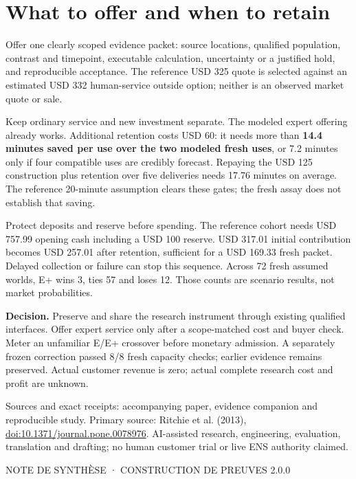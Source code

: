 \documentclass[10pt]{article}
\begin{document}
\section*{What to offer and when to retain}

Offer one clearly scoped evidence packet: source locations, qualified population, contrast and timepoint, executable calculation, uncertainty or a justified hold, and reproducible acceptance. The reference USD 325 quote is selected against an estimated USD 332 human-service outside option; neither is an observed market quote or sale.

Keep ordinary service and new investment separate. The modeled expert offering already works. Additional retention costs USD 60: it needs more than \textbf{14.4 minutes saved per use over the two modeled fresh uses}, or 7.2 minutes only if four compatible uses are credibly forecast. Repaying the USD 125 construction plus retention over five deliveries needs 17.76 minutes on average. The reference 20-minute assumption clears these gates; the fresh assay does not establish that saving.

Protect deposits and reserve before spending. The reference cohort needs USD 757.99 opening cash including a USD 100 reserve. USD 317.01 initial contribution becomes USD 257.01 after retention, sufficient for a USD 169.33 fresh packet. Delayed collection or failure can stop this sequence. Across 72 fresh assumed worlds, E+ wins 3, ties 57 and loses 12. Those counts are scenario results, not market probabilities.

\textbf{Decision.} Preserve and share the research instrument through existing qualified interfaces. Offer expert service only after a scope-matched cost and buyer check. Meter an unfamiliar E/E+ crossover before monetary admission. A separately frozen correction passed 8/8 fresh capacity checks; earlier evidence remains preserved. Actual customer revenue is zero; actual complete research cost and profit are unknown.

{\footnotesize Sources and exact receipts: accompanying paper, evidence companion and reproducible study. Primary source: Ritchie et al. (2013), \href{https://doi.org/10.1371/journal.pone.0078976}{doi:10.1371/journal.pone.0078976}. AI-assisted research, engineering, evaluation, translation and drafting; no human customer trial or live ENS authority claimed.}

\clearpage
{\sffamily\small\color{teal}NOTE DE SYNTHÈSE · CONSTRUCTION DE PREUVES 2.0.0}
\vspace{3mm}
\end{document}
